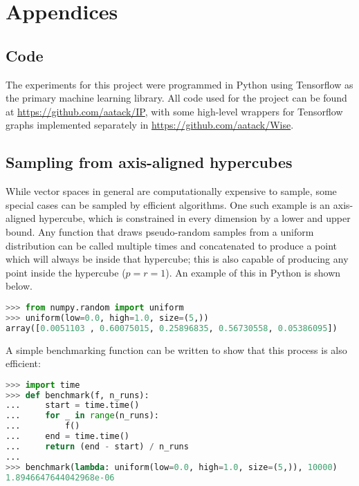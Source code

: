 \documentclass[../main.tex]{subfiles}
\begin{document}
\chapter*{Appendices} \label{chapter:appendices}

\renewcommand{\thesection}{\Alph{section}}
\setcounter{section}{0}
\renewcommand*{\theHsection}{chX.\the\value{section}}

\section{Code} \label{appendix:code}

The experiments for this project were programmed in Python using Tensorflow as the primary machine learning library.
All code used for the project can be found at \url{https://github.com/aatack/IP}, with some high-level wrappers for Tensorflow graphs implemented separately in \url{https://github.com/aatack/Wise}.

\section{Sampling from axis-aligned hypercubes} \label{appendix:samplingFromAxisAlignedHypercubes}

While vector spaces in general are computationally expensive to sample, some special cases can be sampled by efficient algorithms.
One such example is an axis-aligned hypercube, which is constrained in every dimension by a lower and upper bound.
Any function that draws pseudo-random samples from a uniform distribution can be called multiple times and concatenated to produce a point which will always be inside that hypercube; this is also capable of producing any point inside the hypercube ($p=r=1$).
An example of this in Python is shown below.

\begin{lstlisting}[language=python,firstnumber=1,caption={Python code to sample from an axis-aligned hypercube.},captionpos=b]
>>> from numpy.random import uniform
>>> uniform(low=0.0, high=1.0, size=(5,))
array([0.0051103 , 0.60075015, 0.25896835, 0.56730558, 0.05386095])
\end{lstlisting}

A simple benchmarking function can be written to show that this process is also efficient:

\begin{lstlisting}[language=python,firstnumber=1,caption={A simple benchmarking function to prove the efficiency of sampling from an axis-aligned hypercube.  Each sample takes an average of 1.89 microseconds for a 5-dimensional hypercube.},captionpos=b]
>>> import time
>>> def benchmark(f, n_runs):
...     start = time.time()
...     for _ in range(n_runs):
...         f()
...     end = time.time()
...     return (end - start) / n_runs
...
>>> benchmark(lambda: uniform(low=0.0, high=1.0, size=(5,)), 10000)
1.8946647644042968e-06
\end{lstlisting}
\end{document}
